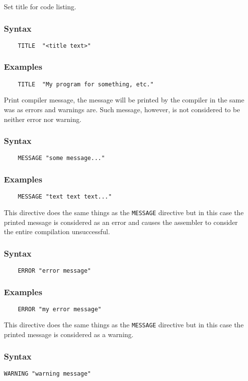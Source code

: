     \clearpage
        Set title for code listing.

        \subsubsection{Syntax}
            \verb'    TITLE  "<title text>"'

        \subsubsection{Examples}
            \verb'    TITLE  "My program for something, etc."'

        Print compiler message, the message will be printed by the compiler in the same was as errors and warnings are. Such message, however, is not considered to be neither error nor warning.

        \subsubsection{Syntax}
            \verb'    MESSAGE "some message..."'

        \subsubsection{Examples}
            \verb'    MESSAGE "text text text..."'

        This directive does the same things as the \texttt{MESSAGE} directive but in this case the printed message is considered as an error and causes the assembler to consider the entire compilation unsuccessful.

        \subsubsection{Syntax}
            \verb'    ERROR "error message"'

        \subsubsection{Examples}
            \verb'    ERROR "my error message"'

        This directive does the same things as the \texttt{MESSAGE} directive but in this case the printed message is considered as a warning.

        \subsubsection{Syntax}
            \verb'WARNING "warning message"'

